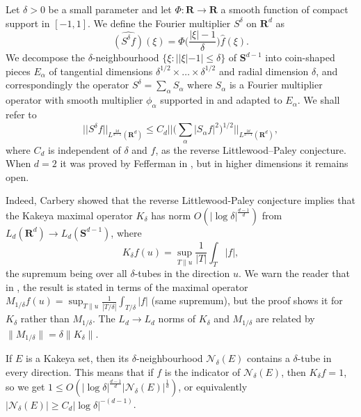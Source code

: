 \documentclass[10pt]{amsart}
\newcommand{\R}{\mathbf{R}}
\begin{document}
 Let $\delta>0$ be a small parameter and let $\Phi:\R\rightarrow\R$ a smooth function of compact support in $[-1,1]$. We define the Fourier multiplier $S^\delta$ on $\R^d$ as
\begin{equation*}
    \widehat{(S^\delta f)}(\xi)=\Phi\Bigg(\frac{|\xi|-1}{\delta}\Bigg)\hat{f}(\xi).
\end{equation*}
We decompose the $\delta$-neighbourhood $\{\xi:||\xi|-1|\leq \delta\}$ of $\mathbf{S}^{d-1}$ into coin-shaped pieces $E_\alpha$ of tangential dimensions $\delta^{1/2}\times\dots\times \delta^{1/2}$ and radial dimension $\delta$, and correspondingly the operator $S^\delta=\sum_\alpha S_\alpha$ where $S_\alpha$ is a Fourier multiplier operator with smooth multiplier $\phi_\alpha$ supported in and adapted to $E_\alpha$. We shall refer to
\begin{equation*}
    ||S^\delta f||_{L^{\frac{2d}{d-1}}(\R^d)}\leq C_d\Bigg|\Bigg|\Bigg(\sum_\alpha|S_\alpha f|^2\Bigg)^{1/2}\Bigg|\Bigg|_{L^{\frac{2d}{d-1}}(\R^d)},
\end{equation*}
where $C_d$ is independent of $\delta$ and $f$, as the reverse Littlewood--Paley conjecture. When $d=2$ it was proved by Fefferman in \cite{0b62136a12e44b6ca6ef02477cb50c4e}, but in higher dimensions it remains open. 

Indeed, Carbery showed \cite{carbery2015remarkreverselittlewoodpaleyrestriction} that the reverse Littlewood-Paley conjecture implies that the Kakeya maximal operator $K_\delta$ has norm $O(|\log \delta|^{\frac{d-1}d})$ from $L_{d}(\R^d) \to L_d(\mathbf{S}^{d-1})$, where 
\begin{equation*}
    K_\delta f(u)=\sup_{T\parallel u} \frac{1}{|T|} \int_T |f|,
\end{equation*}
the supremum being over all $\delta$-tubes in the direction $u$. We warn the reader that in \cite{carbery2015remarkreverselittlewoodpaleyrestriction}, the result is stated in terms of the maximal operator $M_{1/\delta} f(u) =\sup_{T\parallel u} \frac{1}{|T/\delta|} \int_{T/\delta} |f|$ (same supremum), but the proof shows it for $K_\delta$ rather than $M_{1/\delta}$. The $L_d\to L_d$ norms of $K_\delta$ and $M_{1/\delta}$ are related by $\|M_{1/\delta}\| = \delta \|K_\delta\|$. 

If $E$ is a Kakeya set, then its $\delta$-neighbourhood $\mathcal{N}_\delta(E)$ contains a $\delta$-tube in every direction. This means that if $f$ is the indicator of $\mathcal{N}_\delta(E)$, then $K_\delta f=1$, so we get $1 \leq  O( |\log \delta|^{\frac{d-1}d} |\mathcal{N}_\delta(E)|^{\frac 1 d})$, or equivalently $|\mathcal{N}_\delta(E)|\geq C_d |\log \delta|^{-(d-1)}$.
\end{document}
